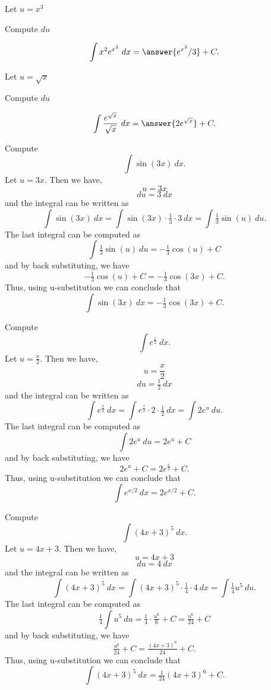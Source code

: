 \documentclass{ximera}
\begin{document}
\begin{problem}
\begin{hint}
Let $u = x^3$
\end{hint}
\begin{hint}
Compute $du$
\end{hint}
\[\int x^2e^{x^3} \ dx = \answer{e^{x^3}/3} +C.\]
\end{problem}


\begin{problem}
\begin{hint}
Let $u = \sqrt x$
\end{hint}
\begin{hint}
Compute $du$
\end{hint}
\[\int \frac{e^{\sqrt x}}{\sqrt x} \ dx = \answer{2e^{\sqrt x}} +C.\]
\end{problem}


\begin{example} Compute 
\[\int \sin(3x) \ dx.\]
Let $u = 3x$.  Then we have,
\[u = 3x\]
\[du = 3 \ dx\]
and the integral can be written as 
\[\int\sin(3x) \ dx =  \int \sin(3x) \cdot \tfrac13\cdot 3 \   dx =   \int \tfrac13 \sin(u) \ du.\]
The last integral can be computed as 
\[ \int \tfrac13 \sin(u) \ du = -\tfrac13 \cos(u) + C\]
and by back substituting, we have 
\[-\tfrac13 \cos(u) + C = -\tfrac13 \cos(3x) + C.\]
Thus, using u-substitution we can conclude that
\[\int \sin(3x) \ dx =  -\tfrac13 \cos(3x) + C.\]
\end{example}

\begin{example} Compute 
\[\int e^{\frac{x}{2}} \ dx.\]
Let $u = \frac{x}{2}$.  Then we have,
\[u = \frac{x}{2}\]
\[du = \tfrac12 \ dx\]
and the integral can be written as 
\[\int e^{\frac{x}{2}} \ dx =  \int e^{\frac{x}{2}} \cdot 2\cdot \tfrac{1}{2}  \   dx =   \int 2e^u \ du.\]
The last integral can be computed as 
\[\int 2e^u \ du = 2 e^u + C\]
and by back substituting, we have 
\[2e^u + C = 2e^{\frac{x}{2}}+ C.\]
Thus, using u-substitution we can conclude that
\[\int e^{x/2} \ dx = 2e^{x/2} + C.\]
\end{example}

\begin{example} Compute 
\[\int (4x+3)^5 \ dx.\]
Let $u = 4x+3$. Then we have,
\[u = 4x+3\]
\[du = 4 \ dx\]
and the integral can be written as 
\[\int (4x+3)^5 \ dx =   \int (4x+3)^5 \cdot \tfrac14\cdot 4  \   dx =   \int \tfrac14 u^5 \ du.\]
The last integral can be computed as 
\[\tfrac14  \int u^5 \ du = \tfrac14  \cdot \tfrac{u^6}{6} + C = \tfrac{u^6}{24} + C\]
and by back substituting, we have 
\[\tfrac{u^6}{24} + C = \tfrac{(4x+3)^6}{24}+ C.\]
Thus, using u-substitution we can conclude that
\[\int (4x+3)^5 \ dx = \tfrac{1}{24}(4x+3)^6 + C.\]
\end{example}
\end{document}
